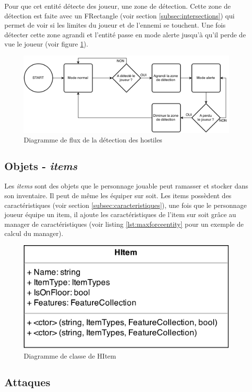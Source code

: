 \documentclass[11pt, a4paper, oneside]{report}
\begin{document}
Pour que cet entité détecte des joueur, une zone de détection. Cette zone de détection est faite avec un FRectangle (voir section \ref{subsec:intersections}) qui permet de voir si les limites du joueur et de l'ennemi se touchent. Une fois détecter cette zone agrandi et l'entité passe en mode alerte jusqu'à qu'il perde de vue le joueur (voir figure \ref{fig:DetectionJoueur}).

\begin{figure}[htp]
	\begin{center}
	\includegraphics[width=.8\textwidth]{DetectionJoueur}
	\caption{Diagramme de flux de la détection des hostiles}
	\label{fig:DetectionJoueur}
	\end{center}
\end{figure}

\subsection{Objets - \textit{items}}
Les \textit{items} sont des objets que le personnage jouable peut ramasser et stocker dans son inventaire. Il peut de même les équiper sur soit. Les items possèdent des caractéristiques (voir section \ref{subsec:caracteristiques}), une fois que le personnage joueur équipe un item, il ajoute les caractéristiques de l'item sur soit grâce au manager de caractéristiques (voir listing \ref{lst:maxforceentity} pour un exemple de calcul du manager).
\begin{figure}[h]
	\begin{center}
	\includegraphics[width=.4\textwidth]{HItem}
	\caption{Diagramme de classe de HItem}
	\label{fig:HItem}
	\end{center}
\end{figure}
\subsection{Attaques}
\end{document}
